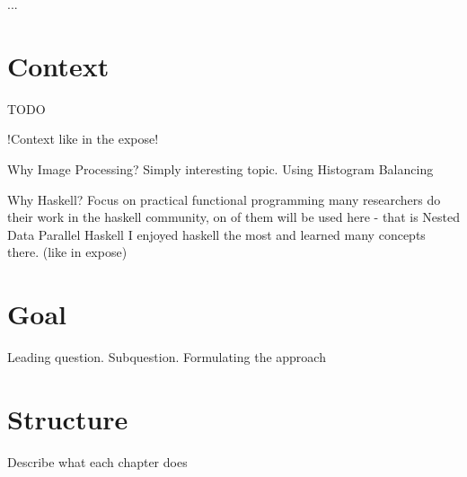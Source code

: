 
...

\section{Context}
  TODO
  
  !Context like in the expose!
  
  Why Image Processing? Simply interesting topic. Using Histogram Balancing
  
  Why Haskell?
    Focus on practical functional programming
    many researchers do their work in the haskell community,
      on of them will be used here - that is Nested Data Parallel Haskell
    I enjoyed haskell the most and learned many concepts there. (like in expose)

\section{Goal}
  Leading question. Subquestion.
  Formulating the approach

\section{Structure}
  Describe what each chapter does

